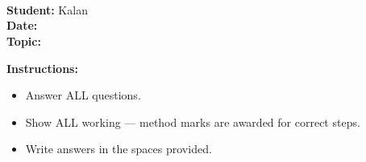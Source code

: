 
\pagestyle{empty}
\begin{center}
    \vspace*{2cm}
    {\Huge \textbf{\examBoard}} \\[5mm]
    {\LARGE \textbf{\examSubject}} \\[3mm]
    {\Large \examPaper} \\[8mm]
    \begin{tcolorbox}[colback=white, colframe=black, arc=4mm, width=0.7\textwidth,
                       boxrule=1.5pt, top=4mm, bottom=4mm]
        \centering
        {\large \textbf{Student:}} Kalan \\[3mm]
        {\large \textbf{Date:}} \examDate \\[3mm]
        {\large \textbf{Topic:}} \examTier
    \end{tcolorbox}
    \vspace{5mm}
    {\large \textbf{Instructions:}}\\[2mm]
    \begin{itemize}[leftmargin=3cm]
        \item Answer ALL questions.
        \item Show ALL working — method marks are awarded for correct steps.
        \item Write answers in the spaces provided.
    \end{itemize}
\end{center}
\newpage
